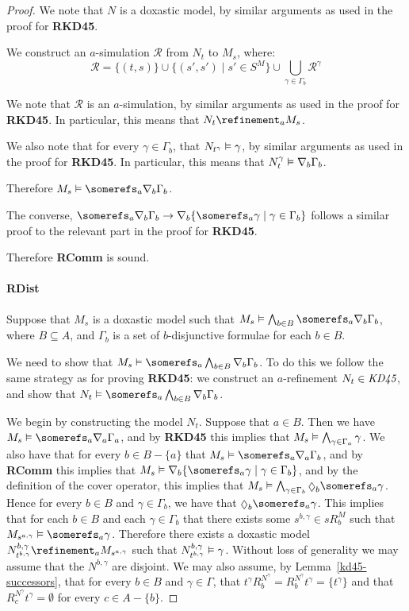 \begin{proof}
We note that $N$ is a doxastic model, by similar arguments as used in the proof
for {\bf RKD45}.

We construct an $a$-simulation $\mathcal{R}$ from $N_t$ to $M_s$, where:
$$\mathcal{R} = \{(t, s)\} \cup \{(s', s') \mid s' \in S^M\} \cup \bigcup_{\gamma \in \Gamma_b} \mathcal{R}^\gamma$$

We note that $\mathcal{R}$ is an $a$-simulation, by similar arguments as used in
the proof for {\bf RKD45}. In particular, this means that $N_t \refinement_a
M_s$.

We also note that for every $\gamma \in \Gamma_b$, that $N_{t^\gamma} \vDash
\gamma$, by similar arguments as used in the proof for {\bf RKD45}. In
particular, this means that $N^\gamma_t \vDash \nabla_b \Gamma_b$.

Therefore $M_s \entails \somerefs_a \covers_b \Gamma_b$.

The converse, $\somerefs_a \covers_b \Gamma_b \implies \covers_b \{\somerefs_a
\gamma \mid \gamma \in \Gamma_b\}$ follows a similar proof to the relevant part in
the proof for {\bf RKD45}.

Therefore {\bf RComm} is sound.

\paragraph{RDist} 
Suppose that $M_s$ is a doxastic model such that $M_s \entails \bigwedge_{b \in
B} \somerefs_a \covers_b \Gamma_b$, where $B \subseteq A$, and $\Gamma_b$ is a
set of $b$-disjunctive formulae for each $b \in B$.

We need to show that $M_s \entails \somerefs_a \bigwedge_{b \in B} \covers_b
\Gamma_b$. To do this we follow the same strategy as for proving {\bf RKD45}: we
construct an $a$-refinement $N_t \in \textit{KD45}$, and show that $N_t \entails
\somerefs_a \bigwedge_{b \in B} \covers_b \Gamma_b$.

We begin by constructing the model $N_t$. Suppose that $a \in B$. Then we have
$M_s \entails \somerefs_a \covers_a \Gamma_a$, and by {\bf RKD45} this implies that
$M_s \vDash \bigwedge_{\gamma \in \Gamma_a} \gamma$. We also have that for
every $b \in B - \{a\}$ that $M_s \entails \somerefs_a \covers_a \Gamma_b$, and
by {\bf RComm} this implies that $M_s \entails \covers_b \{\somerefs_a \gamma
\mid \gamma \in \Gamma_b\}$, and by the definition of the cover operator, this
implies that $M_s \entails \bigwedge_{\gamma \in \Gamma_b} \suspects_b
\somerefs_a \gamma$. Hence for every $b \in B$ and $\gamma \in \Gamma_b$, we
have that $\suspects_b \somerefs_a \gamma$. This implies that for each $b \in B$
and each $\gamma \in \Gamma_b$ that there exists some $s^{b,\gamma} \in sR^M_b$ such
that $M_{s^{a,\gamma}} \entails \somerefs_a \gamma$. Therefore there exists a
doxastic model $N^{b,\gamma}_{t^{b,\gamma}} \refinement_a M_{s^{a,\gamma}}$ such
that $N^{b,\gamma}_{t^{b,\gamma}} \vDash \gamma$. Without loss of generality
we may assume that the $N^{b,\gamma}$ are disjoint. We may also assume, by
Lemma~\ref{kd45-successors}, that for every $b \in B$ and $\gamma \in \Gamma$,
that $t^\gamma R^{N^\gamma}_b = R^{N^\gamma}_b t^\gamma = \{t^\gamma\}$ and that
$R^{N^\gamma}_c t^\gamma = \emptyset$ for every $c \in A - \{b\}$.


\end{proof}
